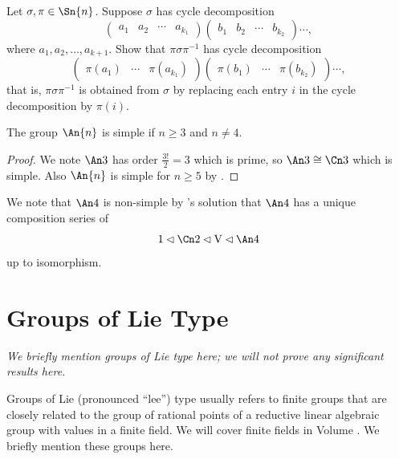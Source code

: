\begin{exercise}\label{exercise-conjugation-of-permutation-by-another}
    Let $\sigma, \pi \in \Sn{n}$. Suppose $\sigma$ has cycle decomposition
    \[
        \begin{pmatrix}a_1&a_2&\cdots&a_{k_1}\end{pmatrix} \begin{pmatrix}b_1&b_2&\cdots&b_{k_2}\end{pmatrix}\cdots,
    \]
    where $a_1, a_2, \dots, a_{k+1}$. Show that $\pi\sigma\pi^{-1}$ has cycle decomposition
    \[
        \begin{pmatrix}\pi(a_1)&\cdots&\pi(a_{k_1})\end{pmatrix} \begin{pmatrix}\pi(b_1)&\cdots&\pi(b_{k_2})\end{pmatrix}\cdots,
    \]
    that is, $\pi\sigma\pi^{-1}$ is obtained from $\sigma$ by replacing each entry $i$ in the cycle decomposition by $\pi(i)$.
\end{exercise}

\begin{corollary}
    The group $\An{n}$ is simple if $n \geq 3$ and $n \neq 4$.
\end{corollary}
\begin{proof}
    We note $\An3$ has order $\frac{3!}{2} = 3$ which is prime, so $\An3 \cong \Cn3$ which is simple. Also $\An{n}$ is simple for $n \geq 5$ by .
\end{proof}

We note that $\An4$ is non-simple by 's solution that $\An4$ has a unique composition series of
\[
    1 \lhd \Cn2 \lhd \mathrm{V} \lhd \An4
\]
up to isomorphism.

\section{Groups of Lie Type}
\textit{We briefly mention groups of Lie type here; we will not prove any significant results here.}

Groups of Lie (pronounced ``lee'') type usually refers to finite groups that are closely related to the group of rational points of a reductive linear algebraic group with values in a finite field. We will cover finite fields in Volume . We briefly mention these groups here.

